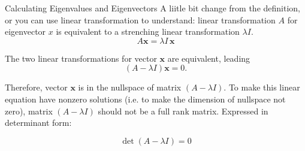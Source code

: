 \documentclass{beamer}
\begin{document}
\begin{frame}{Calculating Eigenvalues and Eigenvectors}
A liitle bit change from the definition, or you can use linear transformation to understand: linear transformation $A$ for eigenvector $x$ is equivalent to a strenching linear transformation $\lambda I$.
\begin{equation*}
    A \mathbf{x}=\lambda I \,\mathbf{x}
\end{equation*}

The two linear transformations for vector $\mathbf{x}$ are equivalent, leading
\begin{equation*}
    \left(A-\lambda I \right) \mathbf{x}=0.
\end{equation*}

Therefore, vector $\mathbf{x}$ is in the nullspace of matrix $\left(A-\lambda I \right)$. To make this linear equation have nonzero solutions (i.e. to make the dimension of nullspace not zero), matrix $\left(A-\lambda I \right)$ should not be a full rank matrix. Expressed in determinant form:

\begin{equation*}
    \det \left( A-\lambda I \right) =0
\end{equation*}
\end{frame}
\end{document}
